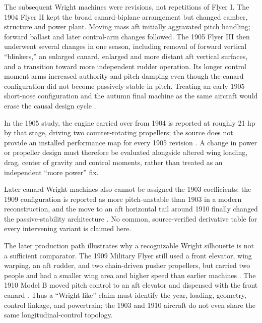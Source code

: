 The subsequent Wright machines were revisions, not repetitions of Flyer I.
The 1904 Flyer II kept the broad canard-biplane arrangement but changed
camber, structure and power plant. Moving mass aft initially aggravated
pitch handling; forward ballast and later control-arm changes followed.
The 1905 Flyer III then underwent several changes in one season, including
removal of forward vertical ``blinkers,'' an enlarged canard, enlarged and
more distant aft vertical surfaces, and a transition toward more independent
rudder operation. Its longer control moment arms increased authority and
pitch damping even though the canard configuration did not become passively
stable in pitch. Treating an early 1905 short-nose configuration and the
autumn final machine as the same aircraft would erase the causal design
cycle \cite{ref41,ref42,ref10}.

In the 1905 study, the engine carried over from 1904 is reported at roughly
21 hp by that stage, driving two counter-rotating propellers; the source
does not provide an installed performance map for every 1905 revision
\cite{ref10}. A change in power or propeller design must therefore be
evaluated alongside altered wing loading, drag, center of gravity and
control moments, rather than treated as an independent ``more power'' fix.

Later canard Wright machines also cannot
be assigned the 1903 coefficients: the 1909 configuration is reported as
more pitch-unstable than 1903 in a modern reconstruction, and the move to
an aft horizontal tail around 1910 finally changed the passive-stability
architecture \cite{ref41}. No common, source-verified derivative table for
every intervening variant is claimed here.

The later production path illustrates why a recognizable Wright silhouette
is not a sufficient comparator. The 1909 Military Flyer still used a front
elevator, wing warping, an aft rudder, and two chain-driven pusher
propellers, but carried two people and had a smaller wing area and higher
speed than earlier machines \cite{ref44}. The 1910 Model B moved pitch
control to an aft elevator and dispensed with the front canard
\cite{ref41,ref45}. Thus a ``Wright-like'' claim must identify the year,
loading, geometry, control linkage, and powertrain; the 1903 and 1910
aircraft do not even share the same longitudinal-control topology.

